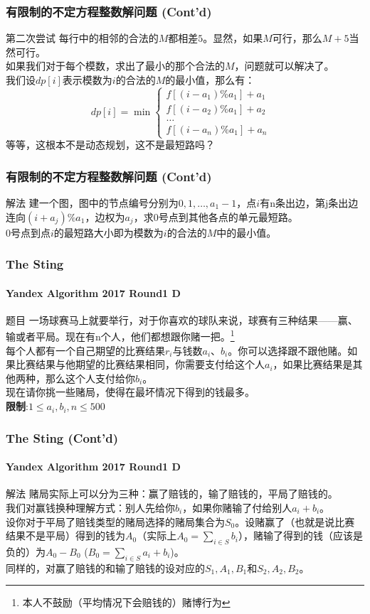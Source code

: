 \documentclass[hyperref={unicode=true}]{beamer}
\begin{document}
  \begin{frame}[fragile]\frametitle{有限制的不定方程整数解问题 (Cont'd)}
    \begin{alertblock}{第二次尝试}
      每行中的相邻的合法的$M$都相差$5$。显然，如果$M$可行，那么$M+5$当然可行。\\
      如果我们对于每个模数，求出了最小的那个合法的$M$，问题就可以解决了。\\
      我们设$dp[i]$表示模数为$i$的合法的$M$的最小值，那么有：
      \[dp[i] = \min\begin{cases}
f[(i-a_1)\%a_1]+a_1 &\\
f[(i-a_2)\%a_1]+a_2 &\\
\ldots &\\
f[(i-a_n)\%a_1]+a_n&
      \end{cases}\]
      等等，这根本不是动态规划，这不是最短路吗？
    \end{alertblock}
  \end{frame}
  \begin{frame}[fragile]\frametitle{有限制的不定方程整数解问题 (Cont'd)}
    \begin{exampleblock}{解法}
      建一个图，图中的节点编号分别为$0,1,\ldots,a_1-1$，点$i$有n条出边，第j条出边连向$(i+a_j)\%a_1$，边权为$a_j$，求$0$号点到其他各点的单元最短路。\\
      $0$号点到点$i$的最短路大小即为模数为$i$的合法的$M$中的最小值。
    \end{exampleblock}
  \end{frame}
  \begin{frame}\frametitle{The Sting}
    \framesubtitle{Yandex Algorithm 2017 Round1 D}
    \begin{block}{题目}
      一场球赛马上就要举行，对于你喜欢的球队来说，球赛有三种结果——赢、输或者平局。现在有n个人，他们都想跟你赌一把。\protect\footnote{本人不鼓励（平均情况下会赔钱的）赌博行为}\\
      每个人都有一个自己期望的比赛结果$r_i$与钱数$a_i$、$b_i$。你可以选择跟不跟他赌。如果比赛结果与他期望的比赛结果相同，你需要支付给这个人$a_i$，如果比赛结果是其他两种，那么这个人支付给你$b_i$。\\
      现在请你挑一些赌局，使得在最坏情况下得到的钱最多。\\
      {\bf 限制}:$1 \leq a_i, b_i, n \leq500$
    \end{block}
  \end{frame}
  \begin{frame}\frametitle{The Sting (Cont'd)}
    \framesubtitle{Yandex Algorithm 2017 Round1 D}
    \begin{exampleblock}{解法}
      赌局实际上可以分为三种：赢了赔钱的，输了赔钱的，平局了赔钱的。\\
      我们对赢钱换种理解方式：别人先给你$b_i$，如果你赌输了付给别人$a_i+b_i$。\\
      设你对于平局了赔钱类型的赌局选择的赌局集合为$S_0$。设赌赢了（也就是说比赛结果不是平局）得到的钱为$A_0$（实际上$A_0=\sum_{i\in S}b_i$），赌输了得到的钱（应该是负的）为$A_0-B_0$ ($B_0=\sum_{i\in S}a_i+b_i$)。\\
      同样的，对赢了赔钱的和输了赔钱的设对应的$S_1,A_1,B_1$和$S_2,A_2,B_2$。
    \end{exampleblock}
  \end{frame}
\end{document}
